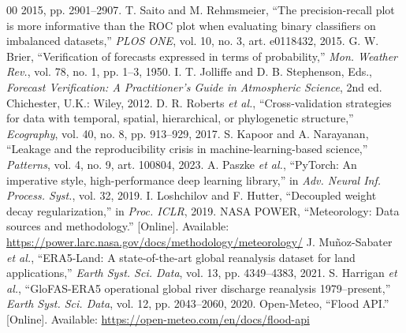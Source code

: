 \documentclass[conference]{IEEEtran}
\begin{document}
\begin{thebibliography}{00}
2015, pp. 2901--2907.
 T. Saito and M. Rehmsmeier, ``The precision-recall plot is
more informative than the ROC plot when evaluating binary classifiers on
imbalanced datasets,'' \emph{PLOS ONE}, vol. 10, no. 3, art. e0118432, 2015.
 G. W. Brier, ``Verification of forecasts expressed in terms
of probability,'' \emph{Mon. Weather Rev.}, vol. 78, no. 1, pp. 1--3, 1950.
 I. T. Jolliffe and D. B. Stephenson, Eds., \emph{Forecast
Verification: A Practitioner's Guide in Atmospheric Science}, 2nd ed.
Chichester, U.K.: Wiley, 2012.
 D. R. Roberts \emph{et al.}, ``Cross-validation strategies
for data with temporal, spatial, hierarchical, or phylogenetic structure,''
\emph{Ecography}, vol. 40, no. 8, pp. 913--929, 2017.
 S. Kapoor and A. Narayanan, ``Leakage and the
reproducibility crisis in machine-learning-based science,'' \emph{Patterns},
vol. 4, no. 9, art. 100804, 2023.
 A. Paszke \emph{et al.}, ``PyTorch: An imperative style,
high-performance deep learning library,'' in \emph{Adv. Neural Inf. Process.
Syst.}, vol. 32, 2019.
 I. Loshchilov and F. Hutter, ``Decoupled weight decay
regularization,'' in \emph{Proc. ICLR}, 2019.
 NASA POWER, ``Meteorology: Data sources and methodology.''
[Online]. Available: \url{https://power.larc.nasa.gov/docs/methodology/meteorology/}
 J. Mu\~noz-Sabater \emph{et al.}, ``ERA5-Land: A
state-of-the-art global reanalysis dataset for land applications,''
\emph{Earth Syst. Sci. Data}, vol. 13, pp. 4349--4383, 2021.
 S. Harrigan \emph{et al.}, ``GloFAS-ERA5 operational
global river discharge reanalysis 1979--present,'' \emph{Earth Syst. Sci. Data},
vol. 12, pp. 2043--2060, 2020.
 Open-Meteo, ``Flood API.'' [Online]. Available:
\url{https://open-meteo.com/en/docs/flood-api}
\end{thebibliography}
\end{document}
